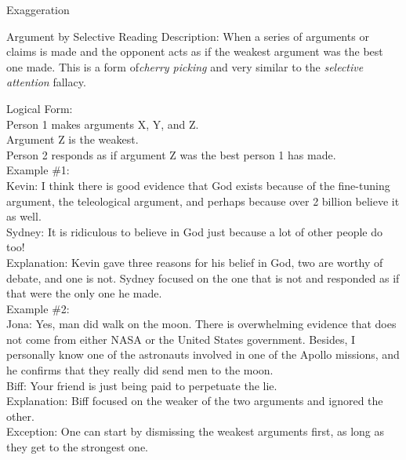 \documentclass[a4paper,12pt,single,pdftex]{scrbook}
\begin{document}
Exaggeration

Argument by Selective Reading
    Description: When a series of arguments or claims is made and the opponent acts as if the weakest argument was the best one made. This is a form of{\it  cherry picking }and very similar to the {\it selective attention }fallacy.

    
      Logical Form:
    \\

    
      Person 1 makes arguments X, Y, and Z.
    \\

    
      Argument Z is the weakest.
    \\

    
      Person 2 responds as if argument Z was the best person 1 has made.
    \\

    
      Example \#1:
    \\

    
      Kevin: I think there is good evidence that God exists because of the fine-tuning argument, the teleological argument, and perhaps because over 2 billion believe it as well.
    \\

    
      Sydney: It is ridiculous to believe in God just because a lot of other people do too!
    \\

    
      Explanation: Kevin gave three reasons for his belief in God, two are worthy of debate, and one is not. Sydney focused on the one that is not and responded as if that were the only one he made.
    \\

    
      Example \#2:
    \\

    
      Jona: Yes, man did walk on the moon. There is overwhelming evidence that does not come from either NASA or the United States government. Besides, I personally know one of the astronauts involved in one of the Apollo missions, and he confirms that they really did send men to the moon.
    \\

    
      Biff: Your friend is just being paid to perpetuate the lie.
    \\

    
      Explanation: Biff focused on the weaker of the two arguments and ignored the other.
    \\

    
      Exception: One can start by dismissing the weakest arguments first, as long as they get to the strongest one.
    \\
\end{document}
